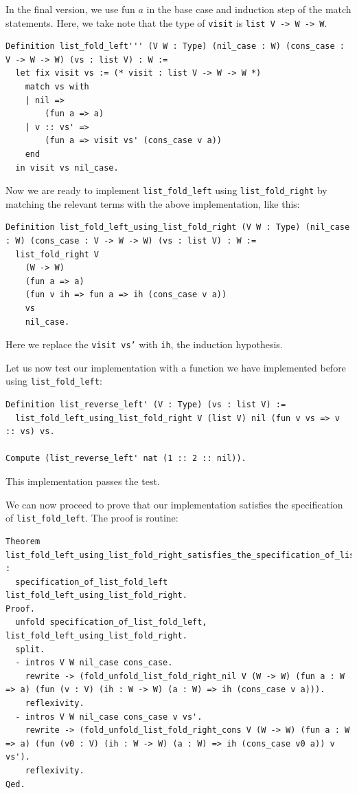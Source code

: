 \documentclass{article}
\begin{document}
In the final version, we use fun $a$ in the base case and induction step of the match statements. Here, we take note that the type of \texttt{visit} is \texttt{list V -> W -> W}.

\begin{lstlisting}
Definition list_fold_left''' (V W : Type) (nil_case : W) (cons_case : V -> W -> W) (vs : list V) : W :=
  let fix visit vs := (* visit : list V -> W -> W *)
    match vs with
    | nil =>
        (fun a => a)
    | v :: vs' =>
        (fun a => visit vs' (cons_case v a))
    end
  in visit vs nil_case.
\end{lstlisting}

Now we are ready to implement \texttt{list\_fold\_left}  using \texttt{list\_fold\_right} by matching the relevant terms with the above implementation, like this:

\begin{lstlisting}
Definition list_fold_left_using_list_fold_right (V W : Type) (nil_case : W) (cons_case : V -> W -> W) (vs : list V) : W :=
  list_fold_right V
    (W -> W)
    (fun a => a)
    (fun v ih => fun a => ih (cons_case v a))
    vs
    nil_case.
\end{lstlisting}

Here we replace the \texttt{visit vs'} with \texttt{ih}, the induction hypothesis.


Let us now test our implementation with a function we have implemented before using \texttt{list\_fold\_left}:

\begin{lstlisting}
Definition list_reverse_left' (V : Type) (vs : list V) :=
  list_fold_left_using_list_fold_right V (list V) nil (fun v vs => v :: vs) vs.

Compute (list_reverse_left' nat (1 :: 2 :: nil)).
\end{lstlisting}

This implementation passes the test.

We can now proceed to prove that our implementation satisfies the specification of \texttt{list\_fold\_left}. The proof is routine:

\begin{lstlisting}
Theorem list_fold_left_using_list_fold_right_satisfies_the_specification_of_list_fold_left :
  specification_of_list_fold_left list_fold_left_using_list_fold_right.
Proof.
  unfold specification_of_list_fold_left, list_fold_left_using_list_fold_right.
  split.
  - intros V W nil_case cons_case.
    rewrite -> (fold_unfold_list_fold_right_nil V (W -> W) (fun a : W => a) (fun (v : V) (ih : W -> W) (a : W) => ih (cons_case v a))).
    reflexivity.
  - intros V W nil_case cons_case v vs'.
    rewrite -> (fold_unfold_list_fold_right_cons V (W -> W) (fun a : W => a) (fun (v0 : V) (ih : W -> W) (a : W) => ih (cons_case v0 a)) v vs').
    reflexivity.
Qed.
\end{lstlisting}
\end{document}
